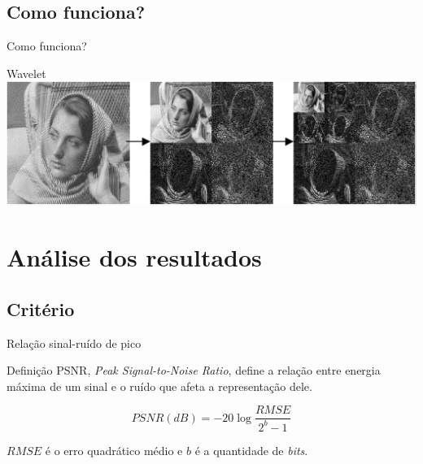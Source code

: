 \documentclass{beamer}
\begin{document}
  \subsection{Como funciona?}
  \begin{frame}{Como funciona?}
    \begin{center}
    \end{center}
  \end{frame}

  \begin{frame}{Wavelet}
    \includegraphics[width=\textwidth]{figure/wavelet-1.jpg}
  \end{frame}

  \section{Análise dos resultados}
  \subsection{Critério}
  \begin{frame}{Relação sinal-ruído de pico}
    \begin{block}{Definição}
      PSNR, \emph{Peak Signal-to-Noise Ratio}, define a relação entre energia máxima de um sinal e o ruído que afeta a representação dele.

      $$ PSNR(dB) = -20 \log \frac{RMSE}{2^b -1} $$

      $RMSE$ é o erro quadrático médio e $b$ é a quantidade de \emph{bits}.
    \end{block}
  \end{frame}
\end{document}
